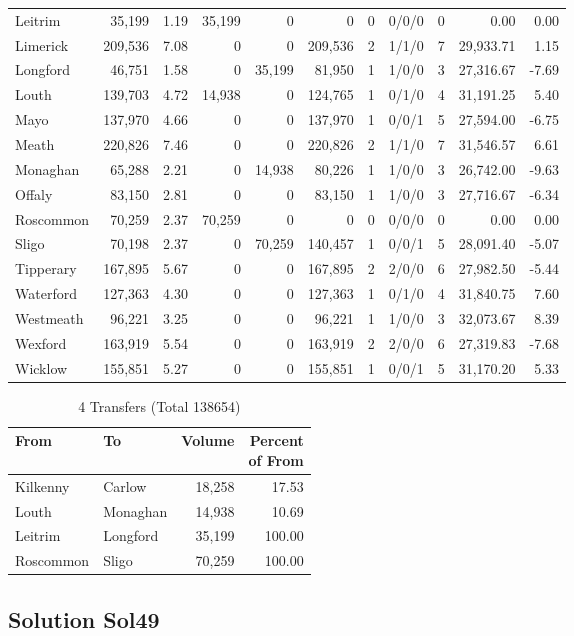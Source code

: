 \documentclass[a4paper]{article}
\begin{document}
\begin{longtable}{lrrrrrrlrrr}
Leitrim&35,199& 1.19&35,199&0&0&0&0/0/0&0& 0.00& 0.00\\ 
Limerick&209,536& 7.08&0&0&209,536&2&1/1/0&7&29,933.71& 1.15\\ 
Longford&46,751& 1.58&0&35,199&81,950&1&1/0/0&3&27,316.67&-7.69\\ 
Louth&139,703& 4.72&14,938&0&124,765&1&0/1/0&4&31,191.25& 5.40\\ 
Mayo&137,970& 4.66&0&0&137,970&1&0/0/1&5&27,594.00&-6.75\\ 
Meath&220,826& 7.46&0&0&220,826&2&1/1/0&7&31,546.57& 6.61\\ 
Monaghan&65,288& 2.21&0&14,938&80,226&1&1/0/0&3&26,742.00&-9.63\\ 
Offaly&83,150& 2.81&0&0&83,150&1&1/0/0&3&27,716.67&-6.34\\ 
Roscommon&70,259& 2.37&70,259&0&0&0&0/0/0&0& 0.00& 0.00\\ 
Sligo&70,198& 2.37&0&70,259&140,457&1&0/0/1&5&28,091.40&-5.07\\ 
Tipperary&167,895& 5.67&0&0&167,895&2&2/0/0&6&27,982.50&-5.44\\ 
Waterford&127,363& 4.30&0&0&127,363&1&0/1/0&4&31,840.75& 7.60\\ 
Westmeath&96,221& 3.25&0&0&96,221&1&1/0/0&3&32,073.67& 8.39\\ 
Wexford&163,919& 5.54&0&0&163,919&2&2/0/0&6&27,319.83&-7.68\\ 
Wicklow&155,851& 5.27&0&0&155,851&1&0/0/1&5&31,170.20& 5.33\\ 
\end{longtable}

\begin{table}[htbp]
\caption{4 Transfers (Total 138654)}
\centering
\begin{tabular}{llrr} \toprule
From &To &Volume &\shortstack{Percent\\of From} \\ \midrule
Kilkenny&Carlow&18,258&17.53\\ 
Louth&Monaghan&14,938&10.69\\ 
Leitrim&Longford&35,199&100.00\\ 
Roscommon&Sligo&70,259&100.00\\ 
\bottomrule
\end{tabular}
\end{table}

\clearpage
\subsection{Solution Sol49}
\end{document}
